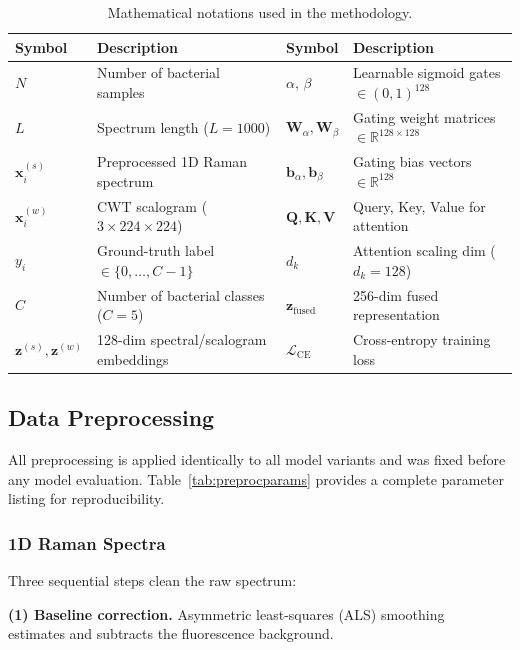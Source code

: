 \documentclass[preprint,12pt]{elsarticle}
\begin{document}
\begin{table}[!t]
\centering
\caption{Mathematical notations used in the methodology.}
\label{tab:notations}
\renewcommand{\arraystretch}{1.2}
\begin{tabular}{lp{4.2cm} | lp{4.2cm}}
  \toprule
  \textbf{Symbol} & \textbf{Description} &
  \textbf{Symbol} & \textbf{Description} \\
  \midrule
  $N$ & Number of bacterial samples &
  $\alpha,\,\beta$ & Learnable sigmoid gates $\in(0,1)^{128}$ \\
  $L$ & Spectrum length ($L=1000$) &
  $\mathbf{W}_\alpha,\mathbf{W}_\beta$ &
      Gating weight matrices $\in\mathbb{R}^{128\times128}$ \\
  $\mathbf{x}_i^{(s)}$ & Preprocessed 1D Raman spectrum &
  $\mathbf{b}_\alpha,\mathbf{b}_\beta$ &
      Gating bias vectors $\in\mathbb{R}^{128}$ \\
  $\mathbf{x}_i^{(w)}$ & CWT scalogram ($3\times224\times224$) &
  $\mathbf{Q},\mathbf{K},\mathbf{V}$ & Query, Key, Value for attention \\
  $y_i$ & Ground-truth label $\in\{0,\ldots,C{-}1\}$ &
  $d_k$ & Attention scaling dim ($d_k=128$) \\
  $C$ & Number of bacterial classes ($C=5$) &
  $\mathbf{z}_\mathrm{fused}$ & 256-dim fused representation \\
  $\mathbf{z}^{(s)},\mathbf{z}^{(w)}$ &
      128-dim spectral/scalogram embeddings &
  $\mathcal{L}_\mathrm{CE}$ & Cross-entropy training loss \\
  \bottomrule
\end{tabular}
\end{table}

\subsection{Data Preprocessing}
\label{ssec:preprocessing}

All preprocessing is applied identically to all model variants and was
fixed before any model evaluation. Table~\ref{tab:preprocparams}
provides a complete parameter listing for reproducibility.

\subsubsection{1D Raman Spectra}
\label{sssec:prep1d}

Three sequential steps clean the raw spectrum:

\textbf{(1) Baseline correction.} Asymmetric least-squares (ALS)
smoothing~\cite{lussier2020deep} estimates and subtracts the
fluorescence background.
\end{document}
